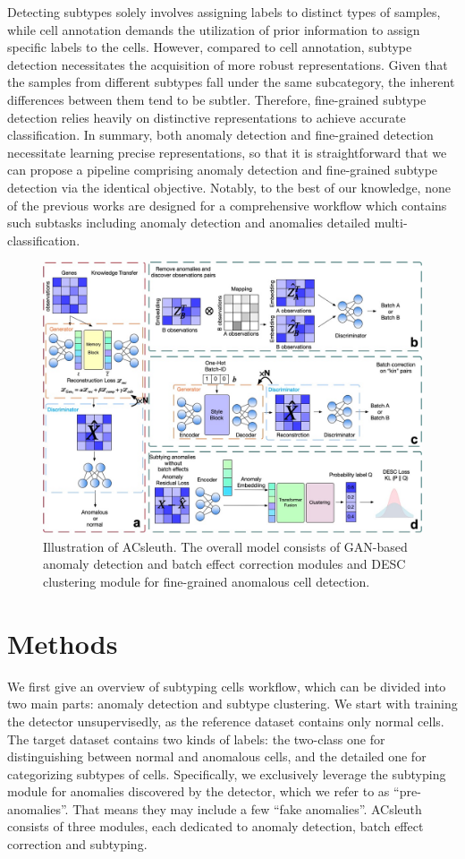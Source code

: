 \documentclass{article}
\begin{document}
Detecting subtypes solely involves assigning labels to distinct types of samples, 
while cell annotation demands the utilization of prior information to assign specific 
labels to the cells. However, compared to cell annotation, subtype detection necessitates 
the acquisition of more robust representations. Given that the samples from different 
subtypes fall under the same subcategory, the inherent differences between them tend to 
be subtler. Therefore, fine-grained subtype detection relies heavily on distinctive representations to 
achieve accurate classification. In summary, both anomaly detection and fine-grained detection 
necessitate learning precise representations, so that it is straightforward that we can 
propose a pipeline comprising anomaly detection and fine-grained subtype detection via the identical objective. 
Notably, to the best of our knowledge, none of the previous works are designed for a 
comprehensive workflow which contains such subtasks including anomaly detection and 
anomalies detailed multi-classification.
\begin{figure}
    \centering
    \includegraphics[scale=0.20]{Framework.jpg}
    \caption{Illustration of ACsleuth. The overall model consists of GAN-based anomaly detection and batch effect correction modules and DESC clustering module for fine-grained anomalous cell detection.}
\end{figure}


\section{Methods}
We first give an overview of subtyping cells workflow, which can be divided into two main 
parts: anomaly detection and subtype clustering. We start with training the detector 
unsupervisedly, as the reference dataset contains only normal cells. The target dataset 
contains two kinds of labels: the two-class one for distinguishing between normal and 
anomalous cells, and the detailed one for categorizing subtypes of cells. Specifically, 
we exclusively leverage the subtyping module for anomalies discovered by the detector, 
which we refer to as “pre-anomalies”. That means they may include a few “fake anomalies”. 
ACsleuth consists of three modules, each dedicated to anomaly detection, batch effect correction and subtyping.
\end{document}
